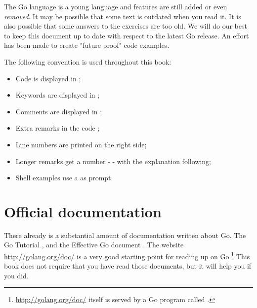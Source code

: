 \begin{lbar}
The Go language is a young language and
features are still added or even \emph{removed}. It 
may be possible that some text is outdated when you
read it. It is also
possible that some answers to the exercises are
too old. We will do our best to keep this document up to 
date with respect to the latest Go release.
An effort has been made to create "future proof" code examples.
\end{lbar}
\noindent{}The following convention is used throughout this book:
\begin{itemize}
\item Code is displayed in ;
\item Keywords are displayed in ;
\item Comments are displayed in ;
\item Extra remarks in the code ;
\item Line numbers are printed on the right side;
\item Longer remarks get a number -  - with the explanation following;
\item Shell examples use a \pr{} as prompt.
\end{itemize}

\section{Official documentation}
There already is a substantial amount of documentation written about Go.
The Go Tutorial \cite{go_tutorial}, and the Effective Go
document \cite{effective_go}. The
website \url{http://golang.org/doc/} is a very good starting point
for reading up on Go.\footnote{\url{http://golang.org/doc/} itself is served by 
a Go program called .} This book does not require that you
have read those documents, but it will help you if you did.

